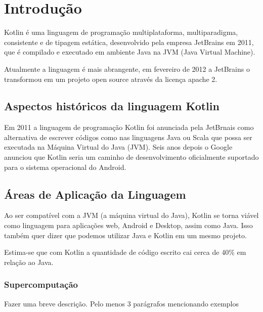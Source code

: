 

\chapter{ Introdu\c{c}\~{a}o}

Kotlin é uma linguagem de programação multiplataforma,
multiparadigma, consistente e de tipagem estática, 
desenvolvido pela empresa JetBrains em 2011, que é
compilado e executado em ambiente Java na JVM 
(Java Virtual Machine). 

Atualmente a linguagem é mais 
abrangente, em fevereiro de 2012 a JetBrains  o transformou
em um projeto open source através da licença apache 2.


\section{Aspectos hist\'{o}ricos da linguagem Kotlin}
Em 2011 a linguagem de programaç\~{a}o Kotlin foi anunciada pela JetBrnais como alternativa
de escrever códigos como nas linguagens Java ou Scala que possa ser executada na Máquina Virtual do Java
(JVM). Seis anos depois o Google anunciou que Kotlin seria um caminho de 
desenvolvimento oficialmente suportado para o sistema operacional do Android.  
\cite{skeen2018kotlin}

\section{\'{A}reas de Aplica\c{c}\~{a}o da Linguagem}
Ao ser compatível com a JVM (a máquina virtual do Java), 
Kotlin se torna viável como linguagem para aplicações web, 
Android e Desktop, assim como Java. Isso também quer dizer 
que podemos utilizar Java e Kotlin em um mesmo projeto. 

Estima-se que com Kotlin a quantidade de código escrito
cai cerca de 40\% em relação ao Java. 

\subsection{ Supercomputa\c{c}\~{a}o}



Fazer uma breve descri\c{c}\~{a}o. Pelo menos 3 par\'{a}grafos mencionando exemplos

